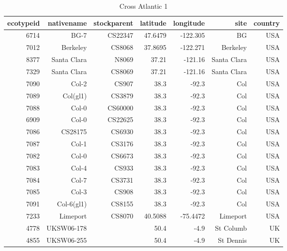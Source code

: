 \documentclass[a4paper,10pt]{article}
\begin{document}
\begin{table}
\caption{Cross Atlantic 1}
\begin{tabular}{|r|r|r|r|r|r|r|}
\hline
ecotypeid & nativename & stockparent & latitude & longitude & site & country\\
\hline
6714 & BG-7        & CS22347     &  47.6479 &  -122.305 & BG                       & USA \\
7012 & Berkeley    & CS8068      &  37.8695 &  -122.271 & Berkeley                 & USA \\
8377 & Santa Clara & N8069       &    37.21 &   -121.16 & Santa Clara              & USA \\
7329 & Santa Clara & CS8069      &    37.21 &   -121.16 & Santa Clara              & USA \\
7090 & Col-2       & CS907       &     38.3 &     -92.3 & Col                      & USA \\
7089 & Col(gl1)    & CS3879      &     38.3 &     -92.3 & Col                      & USA \\
7088 & Col-0       & CS60000     &     38.3 &     -92.3 & Col                      & USA \\
6909 & Col-0       & CS22625     &     38.3 &     -92.3 & Col                      & USA \\
7086 & CS28175     & CS6930      &     38.3 &     -92.3 & Col                      & USA \\
7087 & Col-1       & CS3176      &     38.3 &     -92.3 & Col                      & USA \\
7082 & Col-0       & CS6673      &     38.3 &     -92.3 & Col                      & USA \\
7083 & Col-4       & CS933       &     38.3 &     -92.3 & Col                      & USA \\
7084 & Col-7       & CS3731      &     38.3 &     -92.3 & Col                      & USA \\
7085 & Col-3       & CS908       &     38.3 &     -92.3 & Col                      & USA \\
7091 & Col-6(gl1)  & CS8155      &     38.3 &     -92.3 & Col                      & USA \\
7233 & Limeport    & CS8070      &  40.5088 &  -75.4472 & Limeport                 & USA \\
4778 & UKSW06-178  &             &     50.4 &      -4.9 & St Columb                & UK  \\
4855 & UKSW06-255  &             &     50.4 &      -4.9 & St Dennis                & UK  \\

\end{tabular}
\end{table}
\end{document}
